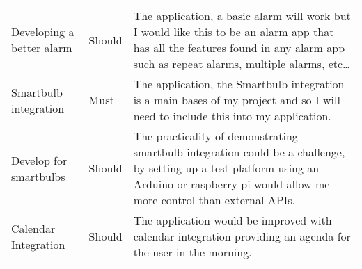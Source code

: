 \begin{longtable}[]{@{}lll@{}}
\begin{minipage}[t]{0.22\columnwidth}\raggedright\strut
Developing a better alarm\strut
\end{minipage} & \begin{minipage}[t]{0.10\columnwidth}\raggedright\strut
Should\strut
\end{minipage} & \begin{minipage}[t]{0.60\columnwidth}\raggedright\strut
The application, a basic alarm will work but I would like this to be an
alarm app that has all the features found in any alarm app such as
repeat alarms, multiple alarms, etc\ldots{}\strut
\end{minipage}\tabularnewline
\begin{minipage}[t]{0.22\columnwidth}\raggedright\strut
Smartbulb integration\strut
\end{minipage} & \begin{minipage}[t]{0.10\columnwidth}\raggedright\strut
Must\strut
\end{minipage} & \begin{minipage}[t]{0.60\columnwidth}\raggedright\strut
The application, the Smartbulb integration is a main bases of my project
and so I will need to include this into my application.\strut
\end{minipage}\tabularnewline
\begin{minipage}[t]{0.22\columnwidth}\raggedright\strut
Develop for smartbulbs\strut
\end{minipage} & \begin{minipage}[t]{0.10\columnwidth}\raggedright\strut
Should\strut
\end{minipage} & \begin{minipage}[t]{0.60\columnwidth}\raggedright\strut
The practicality of demonstrating smartbulb integration could be a
challenge, by setting up a test platform using an Arduino or raspberry
pi would allow me more control than external APIs.\strut
\end{minipage}\tabularnewline
\begin{minipage}[t]{0.22\columnwidth}\raggedright\strut
Calendar Integration\strut
\end{minipage} & \begin{minipage}[t]{0.10\columnwidth}\raggedright\strut
Should\strut
\end{minipage} & \begin{minipage}[t]{0.60\columnwidth}\raggedright\strut
The application would be improved with calendar integration providing an
agenda for the user in the morning.\strut

\end{minipage}
\end{longtable}
